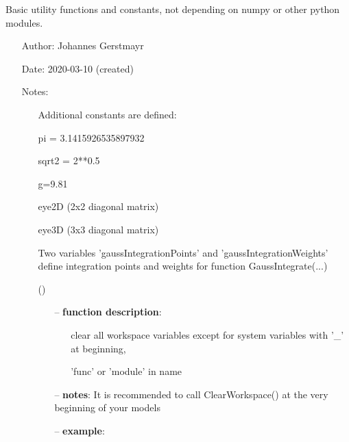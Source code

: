 
\label{sec:module:basicUtilities}
 	Basic utility functions and constants, not depending on numpy or other python modules.
\begin{itemize}[leftmargin=1.4cm]
\setlength{\itemindent}{-1.4cm}
\item[]Author:    Johannes Gerstmayr
\item[]Date:      2020-03-10 (created)
\item[]Notes:
\vspace{-22pt}\begin{itemize}[leftmargin=0.5cm]
\setlength{\itemindent}{-0.5cm}
\item[] 	Additional constants are defined: 
\item[]			pi = 3.1415926535897932 
\item[]			sqrt2 = 2**0.5
\item[]			g=9.81
\item[]			eye2D (2x2 diagonal matrix)
\item[]			eye3D (3x3 diagonal matrix)
\item[] 			Two variables 'gaussIntegrationPoints' and 'gaussIntegrationWeights' define integration points and weights for function GaussIntegrate(...)
\ei
\ei
\begin{flushleft}
\label{sec:basicUtilities:ClearWorkspace}
({\it })
\end{flushleft}
\setlength{\itemindent}{0.7cm}
\begin{itemize}[leftmargin=0.7cm]
  \item[--]  {\bf function description}: \vspace{-6pt}
  \begin{itemize}[leftmargin=1.2cm]
\setlength{\itemindent}{-0.7cm}
    \item[] clear all workspace variables except for system variables with '\_' at beginning,
    \item[]            'func' or 'module' in name
  \end{itemize}
  \item[--]  {\bf notes}: It is recommended to call ClearWorkspace() at the very beginning of your models  \item[--]  {\bf example}: \vspace{-12pt}\ei\begin{lstlisting}[language=Python, xleftmargin=36pt]

\end{lstlisting}
\end{itemize}
\end{itemize}
\end{itemize}
